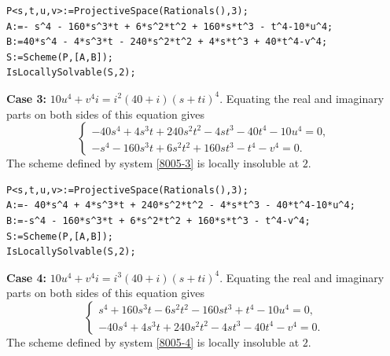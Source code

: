 \documentclass[a4paper,12pt,english,reqno]{amsart}
\begin{document}

\begin{lstlisting}
P<s,t,u,v>:=ProjectiveSpace(Rationals(),3);
A:=- s^4 - 160*s^3*t + 6*s^2*t^2 + 160*s*t^3 - t^4-10*u^4;
B:=40*s^4 - 4*s^3*t - 240*s^2*t^2 + 4*s*t^3 + 40*t^4-v^4;
S:=Scheme(P,[A,B]);
IsLocallySolvable(S,2);
\end{lstlisting}

{\bf Case 3:} $10u^4+v^4i=i^2(40+i)(s+ti)^4$. Equating the real and imaginary parts on both sides of this equation gives
\begin{equation}\label{8005-3}
\begin{cases}
-40s^4 + 4s^3t + 240s^2t^2 - 4st^3 - 40t^4 - 10u^4=0,\\
-s^4 - 160s^3t + 6s^2t^2 + 160st^3 - t^4 - v^4=0.
\end{cases}
\end{equation}
The scheme defined by system \eqref{8005-3} is locally insoluble at $2$.

\begin{lstlisting}
P<s,t,u,v>:=ProjectiveSpace(Rationals(),3);
A:=- 40*s^4 + 4*s^3*t + 240*s^2*t^2 - 4*s*t^3 - 40*t^4-10*u^4;
B:=-s^4 - 160*s^3*t + 6*s^2*t^2 + 160*s*t^3 - t^4-v^4;
S:=Scheme(P,[A,B]);
IsLocallySolvable(S,2);
\end{lstlisting}


{\bf Case 4:} $10u^4+v^4i=i^3(40+i)(s+ti)^4$. Equating the real and imaginary parts on both sides of this equation gives
\begin{equation}\label{8005-4}
\begin{cases}
s^4 + 160s^3t - 6s^2t^2 - 160st^3 + t^4 - 10u^4=0,\\
-40s^4 + 4s^3t + 240s^2t^2 - 4st^3 - 40t^4 - v^4=0.
\end{cases}
\end{equation}
The scheme defined by system \eqref{8005-4} is locally insoluble at $2$.
\end{document}
